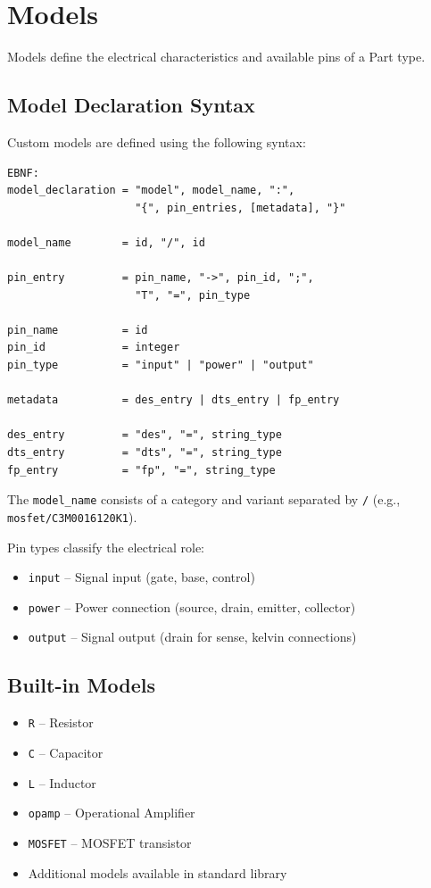 \section{Models}
Models define the electrical characteristics and available pins of a Part type.

\subsection{Model Declaration Syntax}
Custom models are defined using the following syntax:
\begin{verbatim}
EBNF:
model_declaration = "model", model_name, ":",
                    "{", pin_entries, [metadata], "}"

model_name        = id, "/", id

pin_entry         = pin_name, "->", pin_id, ";",
                    "T", "=", pin_type

pin_name          = id
pin_id            = integer
pin_type          = "input" | "power" | "output"

metadata          = des_entry | dts_entry | fp_entry

des_entry         = "des", "=", string_type
dts_entry         = "dts", "=", string_type
fp_entry          = "fp", "=", string_type
\end{verbatim}

The \texttt{model\_name} consists of a category and variant separated by \texttt{/} (e.g., \texttt{mosfet/C3M0016120K1}).

Pin types classify the electrical role:
\begin{itemize}
\item \texttt{input} -- Signal input (gate, base, control)
\item \texttt{power} -- Power connection (source, drain, emitter, collector)
\item \texttt{output} -- Signal output (drain for sense, kelvin connections)
\end{itemize}

\subsection{Built-in Models}
\begin{itemize}
\item \texttt{R} -- Resistor
\item \texttt{C} -- Capacitor
\item \texttt{L} -- Inductor
\item \texttt{opamp} -- Operational Amplifier
\item \texttt{MOSFET} -- MOSFET transistor
\item Additional models available in standard library
\end{itemize}

